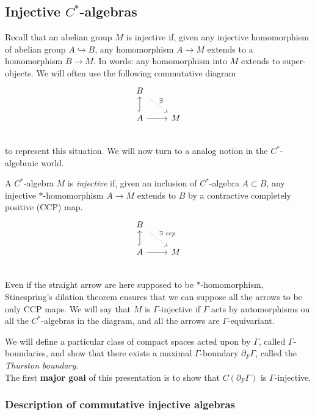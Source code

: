 \subsection{Injective $C^*$-algebras}

Recall that an abelian group $M$ is injective if, given any injective homomorphism of abelian group $A \hookrightarrow B$, any homomorphism $A\rightarrow M$ extends to a homomorphism $B\rightarrow M$. In words: any homomorphism into $M$ extends to super-objects. We will often use the following commutative diagram
\[\begin{tikzcd}
B \arrow[dotted]{dr}{\exists} &  \\
A \arrow[hook]{u} \arrow{r}& M \\
\end{tikzcd}\]
to represent this situation. We will now turn to a analog notion in the $C^*$-algebraic world.\\

\begin{definition}
A $C^*$-algebra $M$ is \textit{injective} if, given an inclusion of $C^*$-algebra $A\subset B$, any injective $*$-homomorphism $A\rightarrow M$ extends to $B$ by a contractive completely positive (CCP) map.
\[\begin{tikzcd}
B \arrow[dotted]{dr}{\exists \ ccp} &  \\
A \arrow[hook]{u} \arrow{r}& M \\
\end{tikzcd}\] 
Even if the straight arrow are here supposed to be $*$-homomorphism, Stinespring's dilation theorem ensures that we can suppose all the arrows to be only CCP maps. We will say that $M$ is $\Gamma$-injective if $\Gamma$ acts by automorphisms on all the $C^*$-algebras in the diagram, and all the arrows are $\Gamma$-equivariant.
\end{definition} 

We will define a particular class of compact spaces acted upon by $\Gamma$, called $\Gamma$-boundaries, and show that there exists a maximal $\Gamma$-boundary $\partial_F \Gamma$, called the \textit{Thurston boundary}. \\

The first \textbf{major goal} of this presentation is to show that $C(\partial_F \Gamma)$ is $\Gamma$-injective.

\subsubsection{Description of commutative injective algebras}

